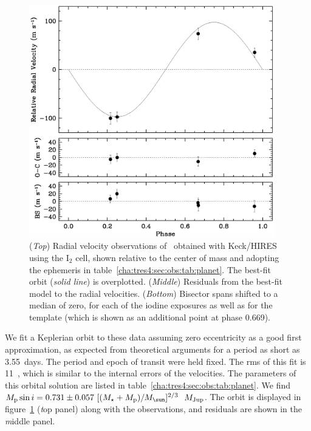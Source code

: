 \begin{figure}
\includegraphics[width=0.95\textwidth]{A_TrES4_f2}
\caption[Keck/HIRES radial velocity observations of \tresFour]{({\em Top}) Radial velocity observations of \tresFour\ obtained with
Keck/HIRES using the I$_2$ cell, shown relative to the center of mass and
adopting the ephemeris in table~\ref{cha:tres4:sec:obs:tab:planet}. The best-fit orbit
({\em solid line}) is overplotted. ({\em Middle}) Residuals from the best-fit
model to the radial velocities. ({\em Bottom}) Bisector spans shifted to a
median of zero, for each of the iodine exposures as well as for the template
(which is shown as an additional point at phase 0.669).\label{cha:tres4:sec:obs:fig:rv}}
\end{figure}

We fit a Keplerian orbit to these data assuming zero eccentricity as a good
first approximation, as expected from theoretical arguments for a period as
short as 3.55~days. The period and epoch of transit were held fixed. The rms of
this fit is 11~\ms, which is similar to the internal errors of the velocities.
The parameters of this orbital solution are listed in table~\ref{cha:tres4:sec:obs:tab:planet}. We
find \mbox{$M_{\rm p} \sin i = 0.731 \pm 0.057~[(M_{\star} + M_{\rm p})/M_{\sun}]^{2/3}$~$M_{\rm Jup}$}.
The orbit is displayed in figure~\ref{cha:tres4:sec:obs:fig:rv} ({\textit top panel}) along with the
observations, and residuals are shown in the {\textit middle panel}.

